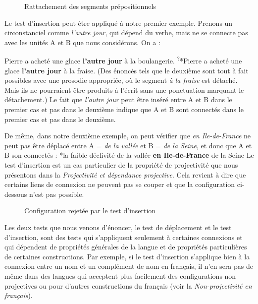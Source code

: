 \begin{figure}

\caption{\label{fig:}Rattachement des segments prépositionnels}
\end{figure}

Le test d’insertion peut être appliqué à notre premier exemple. Prenons un circonstanciel comme \textit{l’autre jour}, qui dépend du verbe, mais ne se connecte pas avec les unités A et B que nous considérons. On a :

\ea
 {Pierre a acheté une glace} \textbf{{l’autre jour}}  {à la boulangerie.}
 \z
\ea
    \textsuperscript{?}{*Pierre a acheté une glace} \textbf{{l’autre jour}}  {à la fraise.}
\z
(Des énoncés tels que le deuxième sont tout à fait possibles avec une prosodie appropriée, où le segment \textit{à la fraise} est détaché. Mais ils ne pourraient être produits à l’écrit sans une ponctuation marquant le détachement.) Le fait que \textit{l’autre jour} peut être inséré entre A et B dans le premier cas et pas dans le deuxième indique que A et B sont connectés dans le premier cas et pas dans le deuxième.

De même, dans notre deuxième exemple, on peut vérifier que \textit{en Ile-de-France} ne peut pas être déplacé entre A = \textit{de la vallée} et B = \textit{de la Seine}, et donc que A et B son connectés :
\ea
    *{la faible déclivité de la vallée} \textbf{{en Ile-de-France}}  {de la Seine}
\z
Le test d’insertion est un cas particulier de la propriété de projectivité que nous présentons dans la  \textit{Projectivité et dépendance projective}. Cela revient à dire que certains liens de connexion ne peuvent pas se couper et que la configuration ci-dessous n’est pas possible.

\begin{figure}
\caption{\label{fig:}Configuration rejetée par le test d’insertion}
\end{figure}

Les deux tests que nous venons d’énoncer, le test de déplacement et le test d’insertion, sont des tests qui s’appliquent seulement à certaines connexions et qui dépendent de propriétés générales de la langue et de propriétés particulières de certaines constructions. Par exemple, si le test d’insertion s’applique bien à la connexion entre un nom et un complément de nom en français, il n’en sera pas de même dans des langues qui acceptent plus facilement des configurations non projectives ou pour d’autres constructions du français (voir la  \textit{Non-projectivité} \textit{en français}).

